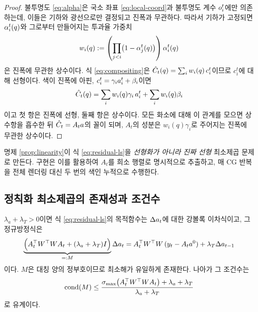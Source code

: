 \begin{proof}
불투명도 \eqref{eq:alpha}은 국소 좌표 \eqref{eq:local-coord}과 불투명도 계수
$o^t_i$에만 의존하는데, 이들은 기하와 광선으로만 결정되고 진폭과 무관하다. 따라서
기하가 고정되면 $\alpha^t_i(q)$와 그로부터 만들어지는 투과율 가중치
\begin{equation}
  w_i(q) := \left(\prod_{j<i}\bigl(1-\alpha^t_j(q)\bigr)\right)\alpha^t_i(q)
  \label{eq:weights}
\end{equation}
은 진폭에 무관한 상수이다. 식 \eqref{eq:compositing}은
$\hat{C}_t(q) = \sum_i w_i(q)\,c^t_i$이므로 $c^t_i$에 대해 선형이다. 색이 진폭에 아핀,
$c^t_i = \gamma_i a^t_i + \beta_i$이면
\[
  \hat{C}_t(q) = \sum_i w_i(q)\gamma_i\,a^t_i + \sum_i w_i(q)\beta_i
\]
이고 첫 항은 진폭에 선형, 둘째 항은 상수이다. 모든 화소에 대해 이 관계를 모으면
상수항을 흡수한 뒤 $\hat{C}_t = A_t a$의 꼴이 되며, $A_t$의 성분은
$w_i(q)\gamma_i$로 주어지는 진폭에 무관한 상수이다.
\end{proof}

명제 \ref{prop:linearity}이 식 \eqref{eq:residual-ls}을 \emph{선형화가 아니라 진짜
선형} 최소제곱 문제로 만든다. 구현은 이를 활용하여 $A_t$를 희소 행렬로 명시적으로
추출하고, 매 CG 반복을 전체 렌더링 대신 두 번의 색인 누적으로 수행한다.

\subsection{정칙화 최소제곱의 존재성과 조건수}

\begin{proposition}
\label{prop:spd}
$\lambda_a + \lambda_T > 0$이면 식 \eqref{eq:residual-ls}의 목적함수는
$\Delta a_t$에 대한 강볼록 이차식이고, 그 정규방정식은
\begin{equation}
  \underbrace{\Bigl(A_t^{\top} W^{\top} W A_t + (\lambda_a+\lambda_T)I\Bigr)}_{=:M}
  \Delta a_t
  = A_t^{\top} W^{\top} W\,(y_t - A_t a^0) + \lambda_T \Delta a_{t-1}
  \label{eq:normal-equations}
\end{equation}
이다. $M$은 대칭 양의 정부호이므로 최소해가 유일하게 존재한다. 나아가 그 조건수는
\begin{equation}
  \operatorname{cond}(M)
  \le \frac{\sigma_{\max}\bigl(A_t^{\top} W^{\top} W A_t\bigr) + \lambda_a + \lambda_T}
           {\lambda_a+\lambda_T}
  \label{eq:cond-bound}
\end{equation}
로 유계이다.
\end{proposition}

